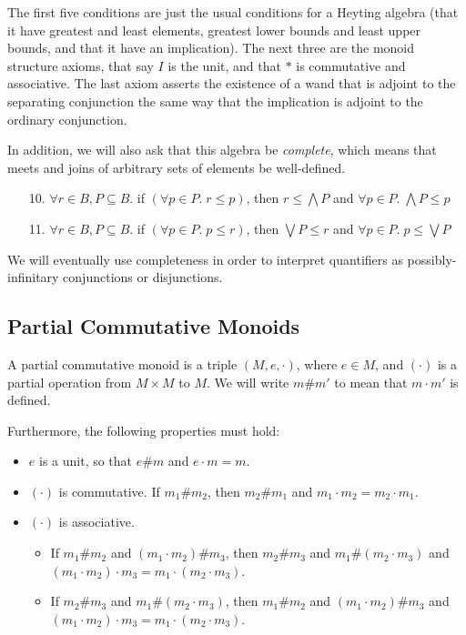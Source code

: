 The first five conditions are just the usual conditions for a Heyting
algebra (that it have greatest and least elements, greatest lower
bounds and least upper bounds, and that it have an implication). The
next three are the monoid structure axioms, that say $I$ is the unit,
and that $*$ is commutative and associative. The last axiom asserts
the existence of a wand that is adjoint to the separating conjunction
the same way that the implication is adjoint to the ordinary
conjunction.

In addition, we will also ask that this algebra be \emph{complete},
which means that meets and joins of arbitrary sets of elements be
well-defined.

\begin{enumerate}
\item[10.] $\forall r\in B, P \subseteq B.$ if $(\forall p \in P.\; r \leq p)$, then  
      $r \leq \bigwedge P $ and 
      $\forall p \in P.\; \bigwedge P \leq p$
\item[11.] $\forall r \in B, P \subseteq B.$ if $(\forall p \in P.\; p \leq r)$, then  
      $\bigvee P \leq r$ and 
      $\forall p \in P.\; p \leq \bigvee P$
\end{enumerate}

We will eventually use completeness in order to interpret quantifiers as 
possibly-infinitary conjunctions or disjunctions.
 
\subsection{Partial Commutative Monoids}

A partial commutative monoid is a triple $(M, e, \cdot)$, where $e \in
M$, and $(\cdot)$ is a partial operation from $M \times M$ to $M$. We
will write $m \# m'$ to mean that $m \cdot m'$ is defined. 

Furthermore, the following properties must hold:

\begin{itemize}
\item $e$ is a unit, so that $e \# m$ and $e \cdot m = m$. 
\item $(\cdot)$ is commutative. If $m_1 \# m_2$, then $m_2 \# m_1$ and $m_1 \cdot m_2 = m_2 \cdot m_1$. 
\item $(\cdot)$ is associative. 
  \begin{itemize}
  \item If $m_1 \# m_2$ and $(m_1 \cdot m_2) \# m_3$, then $m_2 \# m_3$ and $m_1 \# (m_2 \cdot m_3)$ and $(m_1 \cdot m_2) \cdot m_3 = m_1 \cdot (m_2 \cdot m_3)$.
  \item If $m_2 \# m_3$ and $m_1 \# (m_2 \cdot m_3)$, then $m_1 \# m_2$ and $(m_1 \cdot m_2) \# m_3$ and $(m_1 \cdot m_2) \cdot m_3 = m_1 \cdot (m_2 \cdot m_3)$.
  \end{itemize}
  
  
\end{itemize}

